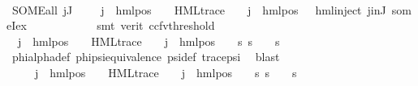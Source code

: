 \begin{isabellebody}
\ \ \ \ \ \ \ \ \ \ \isamarkupfalse%
\ SOME{\isacharunderscore}{\kern0pt}all\ {\isacartoucheopen}{\isasymforall}j{\isasymin}J{\isachardot}{\kern0pt}\ {\isasymexists}{\isasymalpha}\ {\isasympsi}\ {\isasymphi}{\isachardot}{\kern0pt}\ {\isasymPsi}\ j\ {\isacharequal}{\kern0pt}\ hml{\isacharunderscore}{\kern0pt}pos\ {\isasymalpha}\ {\isasympsi}\ {\isasymand}\ HML{\isacharunderscore}{\kern0pt}trace\ {\isasympsi}\ {\isasymand}\ {\isasymPhi}\ j\ {\isacharequal}{\kern0pt}\ hml{\isacharunderscore}{\kern0pt}pos\ {\isasymalpha}\ {\isasymphi}{\isacartoucheclose}\ hml{\isachardot}{\kern0pt}inject{\isacharparenleft}{\kern0pt}{}{\isacharparenright}{\kern0pt}\ j{\isacharunderscore}{\kern0pt}in{\isacharunderscore}{\kern0pt}J\ someI{\isacharunderscore}{\kern0pt}ex\isanewline
\ \ \ \ \ \ \ \ \ \ \isamarkupfalse%
\ {\isacharparenleft}{\kern0pt}smt\ {\isacharparenleft}{\kern0pt}verit{\isacharcomma}{\kern0pt}\ ccfv{\isacharunderscore}{\kern0pt}threshold{\isacharparenright}{\kern0pt}{\isacharparenright}{\kern0pt}\isanewline
\ \ \ \ \ \ \ \ \isamarkupfalse%
\ {\isachardoublequoteopen}{\isasymPsi}\ j\ {\isacharequal}{\kern0pt}\ hml{\isacharunderscore}{\kern0pt}pos\ {\isasymalpha}\ {\isasympsi}\ {\isasymand}\ HML{\isacharunderscore}{\kern0pt}trace\ {\isasympsi}\ {\isasymand}\ {\isasymPhi}\ j\ {\isacharequal}{\kern0pt}\ hml{\isacharunderscore}{\kern0pt}pos\ {\isasymalpha}\ {\isasymphi}\ {\isasymand}\ {\isacharparenleft}{\kern0pt}{\isasymforall}s{\isachardot}{\kern0pt}\ s\ {\isasymTurnstile}\ {\isasymphi}\ {\isasymlongleftrightarrow}\ s\ {\isasymTurnstile}\ {\isasympsi}{\isacharparenright}{\kern0pt}{\isachardoublequoteclose}\isanewline
\ \ \ \ \ \ \ \ \ \ \isamarkupfalse%
\ phi{\isacharunderscore}{\kern0pt}alpha{\isacharunderscore}{\kern0pt}def\ phi{\isacharunderscore}{\kern0pt}psi{\isacharunderscore}{\kern0pt}equivalence\ psi{\isacharunderscore}{\kern0pt}def\ trace{\isacharunderscore}{\kern0pt}psi\ \isamarkupfalse%
\ blast\isanewline
\ \ \ \ \ \ \ \ \isamarkupfalse%
\ \isamarkupfalse%
\ {\isachardoublequoteopen}{\isasymexists}{\isasymalpha}\ {\isasympsi}\ {\isasymphi}{\isachardot}{\kern0pt}\ {\isasymPsi}\ j\ {\isacharequal}{\kern0pt}\ hml{\isacharunderscore}{\kern0pt}pos\ {\isasymalpha}\ {\isasympsi}\ {\isasymand}\ HML{\isacharunderscore}{\kern0pt}trace\ {\isasympsi}\ {\isasymand}\ {\isasymPhi}\ j\ {\isacharequal}{\kern0pt}\ hml{\isacharunderscore}{\kern0pt}pos\ {\isasymalpha}\ {\isasymphi}\ {\isasymand}\ {\isacharparenleft}{\kern0pt}{\isasymforall}s{\isachardot}{\kern0pt}\ {\isacharparenleft}{\kern0pt}s\ {\isasymTurnstile}\ {\isasymphi}{\isacharparenright}{\kern0pt}\ {\isacharequal}{\kern0pt}\ {\isacharparenleft}{\kern0pt}s\ {\isasymTurnstile}\ {\isasympsi}{\isacharparenright}{\kern0pt}{\isacharparenright}{\kern0pt}{\isachardoublequoteclose}\isanewline

\end{isabellebody}

